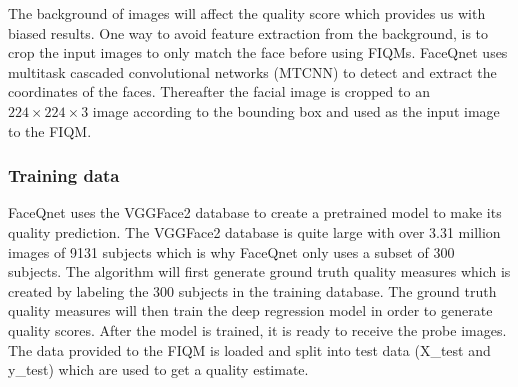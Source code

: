 The background of images will affect the quality score which provides us with biased results. One way to avoid feature extraction from the background, is to crop the input images to only match the face before using FIQMs. FaceQnet uses multitask cascaded convolutional networks (MTCNN) to detect and extract the coordinates of the faces. Thereafter the facial image is cropped to an $224 \times 224 \times 3$ image according to the bounding box and used as the input image to the FIQM. 

\subsubsection*{Training data}
FaceQnet uses the VGGFace2 \cite{VGGFace2} database to create a pretrained model to make its quality prediction. The VGGFace2 database is quite large with over 3.31 million images of 9131 subjects which is why FaceQnet only uses a subset of 300 subjects. The algorithm will first generate ground truth quality measures which is created by labeling the 300 subjects in the training database. The ground truth quality measures will then train the deep regression model in order to generate quality scores. After the model is trained, it is ready to receive the probe images. The data provided to the FIQM is loaded and split into test data (X\_test and y\_test) which are used to get a quality estimate. 

